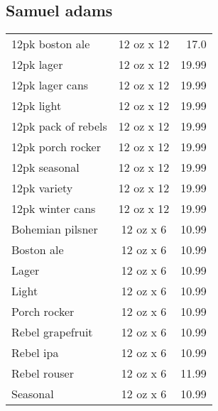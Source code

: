 \documentclass{article}%
\begin{document}
\begin{multicols}{3}
\subsection*{Samuel adams}%
\begin{tabular}{>{\raggedright}p{16ex\hangindent=3ex} c r}%
12pk boston ale&12 oz x 12&17.0\\%
12pk lager&12 oz x 12&19.99\\%
12pk lager cans&12 oz x 12&19.99\\%
12pk light&12 oz x 12&19.99\\%
12pk pack of rebels&12 oz x 12&19.99\\%
12pk porch rocker&12 oz x 12&19.99\\%
12pk seasonal&12 oz x 12&19.99\\%
12pk variety&12 oz x 12&19.99\\%
12pk winter cans&12 oz x 12&19.99\\%
Bohemian pilsner&12 oz x 6&10.99\\%
Boston ale&12 oz x 6&10.99\\%
Lager&12 oz x 6&10.99\\%
Light&12 oz x 6&10.99\\%
Porch rocker&12 oz x 6&10.99\\%
Rebel grapefruit&12 oz x 6&10.99\\%
Rebel ipa&12 oz x 6&10.99\\%
Rebel rouser&12 oz x 6&11.99\\%
Seasonal&12 oz x 6&10.99\\%
\end{tabular}

%
\end{multicols}%
\end{document}

